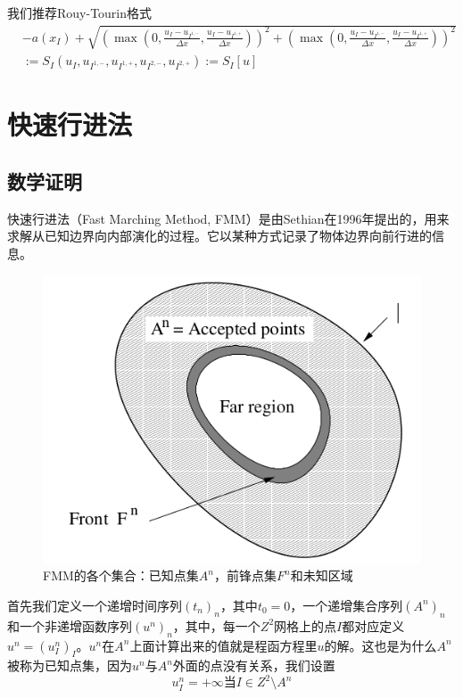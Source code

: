 我们推荐Rouy-Tourin格式
\begin{equation}
    \label{eikonal_equation_3}
    \begin{aligned}
    & -a(x_I) + \sqrt{(\max(0, \frac{u_I - u_{I^{1, -}}}{\Delta x}, \frac{u_I - u_{I^{1, +}}}{\Delta x}))^2 + (\max(0, \frac{u_I - u_{I^{1, -}}}{\Delta x}, \frac{u_I - u_{I^{1, +}}}{\Delta x}))^2} \\
    & := S_I(u_I, u_{I^{1, -}}, u_{I^{1, +}}, u_{I^{2, -}}, u_{I^{2, +}}) := S_I[u]
    \end{aligned}
\end{equation}

\section{快速行进法}
\subsection{数学证明}
快速行进法（Fast Marching Method, FMM）是由Sethian在1996年提出的，用来求解从已知边界向内部演化的过程。它以某种方式记录了物体边界向前行进的信息。
\begin{figure}[h!]
    \centering
    \includegraphics[width=300bp]{figure/sets_fmm.png}
    \caption{FMM的各个集合：已知点集$A^n$，前锋点集$F^n$和未知区域}
    \label{fig-sets_fmm}
\end{figure}

首先我们定义一个递增时间序列$(t_{n})_{n}$，其中$t_{0} = 0$，一个递增集合序列$(A^{n})_{n}$和一个非递增函数序列$(u^{n})_{n}$，其中，每一个$Z^{2}$网格上的点$I$都对应定义$u^{n} = (u^{n}_{I})_{I}$。$u^n$在$A^n$上面计算出来的值就是程函方程里$u$的解。这也是为什么$A^n$被称为已知点集，因为$u^n$与$A^n$外面的点没有关系，我们设置
\begin{equation*}
    \label{far_region}
    u^n_I = +\infty \mbox{当} I \in Z^2 \setminus A^n
\end{equation*}

